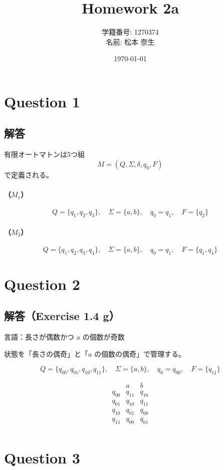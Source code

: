 \documentclass[uplatex,a4paper,11pt]{jsarticle}
\title{Homework 2a}
\author{学籍番号: 1270374 \\ 名前: 松本 奈生}
\date{\today}
\begin{document}
\maketitle

\section*{Question 1}
\subsection*{解答}

有限オートマトンは5つ組
\[
M=(Q,\Sigma,\delta,q_0,F)
\]
で定義される。

\paragraph{（$M_1$）}
\[
Q=\{q_1,q_2,q_3\},\quad \Sigma=\{a,b\},\quad q_0=q_1,\quad F=\{q_2\}
\]

\paragraph{（$M_2$）}
\[
Q=\{q_1,q_2,q_3,q_4\},\quad \Sigma=\{a,b\},\quad q_0=q_1,\quad F=\{q_1,q_4\}
\]

\section*{Question 2}
\subsection*{解答（Exercise 1.4 g）}

言語：長さが偶数かつ $a$ の個数が奇数

状態を「長さの偶奇」と「$a$ の個数の偶奇」で管理する。

\[
Q=\{q_{00},q_{01},q_{10},q_{11}\},\quad \Sigma=\{a,b\},\quad q_0=q_{00},\quad F=\{q_{11}\}
\]

\[
\begin{array}{c|cc}
 & a & b \\
\hline
q_{00} & q_{11} & q_{10} \\
q_{01} & q_{10} & q_{11} \\
q_{10} & q_{01} & q_{00} \\
q_{11} & q_{00} & q_{01} \\
\end{array}
\]

\section*{Question 3}
\end{document}
